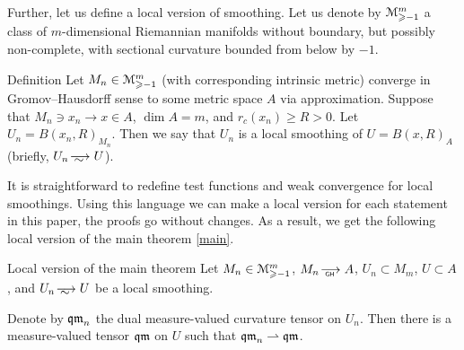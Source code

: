 Further, let us define a local version of smoothing.
Let us denote by
$\mathcal M_{\geqslant -1}^m$ a class of $m$-dimensional Riemannian 
manifolds without boundary, but possibly non-complete, with sectional curvature bounded
from below by $-1$.

\begin{thm}{Definition}
Let 
$M_n\in\mathcal M_{\geqslant -1}^m$ (with corresponding intrinsic metric)
converge in Gromov--Hausdorff sense to some metric space $A$ via
approximation.
Suppose that $M_n\ni x_n\to x\in A$, $\dim A=m$,
and $r_c(x_n)\ge R>0$.
Let 
$U_n=B(x_n,R)_{M_n}$.
Then we say that $U_n$ is a local smoothing of $U=B(x,R)_A$ (briefly, $U_n\smooths{} U$).
\end{thm}

It is straightforward to redefine test functions and weak convergence for local smoothings.
Using this language we can make a local version for each statement in this paper, the proofs go without changes.
As a result, we get the following local version of the main theorem \ref{main}.
 
\begin{thm}{Local version of the main theorem}\label{mainloc}
Let   
$M_n\in\mathcal M_{\geqslant -1}^m$,
$M_n\GHto A$, $U_n\subset M_m$,
  $U\subset A$, and $U_n\smooths{} U$ be a local smoothing.
  
Denote by $\operatorname{\mathfrak{qm}}_n$ the dual measure-valued curvature tensor on $U_n$.
Then there is a measure-valued tensor $\operatorname{\mathfrak{qm}}$ on $U$ such that $\operatorname{\mathfrak{qm}}_n\rightharpoonup \operatorname{\mathfrak{qm}}$.
\end{thm} 
